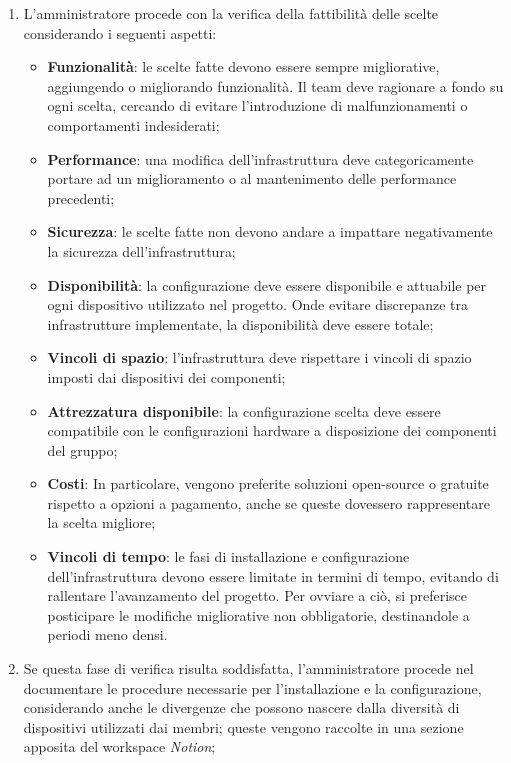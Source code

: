 \documentclass[10pt, a4paper]{article}
\begin{document}
\begin{enumerate}
    \item L'amministratore procede con la verifica della fattibilità delle scelte considerando i seguenti aspetti:
    \begin{itemize}
        \item \textbf{Funzionalità}: le scelte fatte devono essere sempre migliorative, aggiungendo o migliorando funzionalità. Il team deve ragionare a fondo su ogni scelta, cercando di evitare l'introduzione di malfunzionamenti o comportamenti indesiderati;
        \item \textbf{Performance}: una modifica dell'infrastruttura deve categoricamente portare ad un miglioramento o al mantenimento delle performance precedenti;
        \item \textbf{Sicurezza}: le scelte fatte non devono andare a impattare negativamente la sicurezza dell'infrastruttura;
        \item \textbf{Disponibilità}: la configurazione deve essere disponibile e attuabile per ogni dispositivo utilizzato nel progetto. Onde evitare discrepanze tra infrastrutture implementate, la disponibilità deve essere totale;
        \item \textbf{Vincoli di spazio}: l'infrastruttura deve rispettare i vincoli di spazio imposti dai dispositivi dei componenti;
        \item \textbf{Attrezzatura disponibile}: la configurazione scelta deve essere compatibile con le configurazioni hardware a disposizione dei componenti del gruppo;
        \item \textbf{Costi}: In particolare, vengono preferite soluzioni open-source o gratuite rispetto a opzioni a pagamento, anche se queste dovessero rappresentare la scelta migliore;
        \item \textbf{Vincoli di tempo}: le fasi di installazione e configurazione dell'infrastruttura devono essere limitate in termini di tempo, evitando di rallentare l'avanzamento del progetto. Per ovviare a ciò, si preferisce posticipare le modifiche migliorative non obbligatorie, destinandole a periodi meno densi.
    \end{itemize}
    \item Se questa fase di verifica risulta soddisfatta, l'amministratore procede nel documentare le procedure necessarie per l'installazione e la configurazione, considerando anche le divergenze che possono nascere dalla diversità di dispositivi utilizzati dai membri; queste vengono raccolte in una sezione apposita del workspace \textit{Notion};

\end{enumerate}
\end{document}
